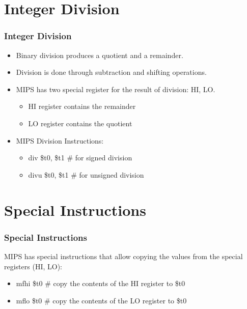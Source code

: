 \documentclass[
	10pt, %
	hmargin=1cm,vmargin=0cm,head=0.5cm,headsep=0pt,foot=0.5cm,margin=2cm
]{beamer}
\begin{document}
\section{Integer Division} 
\begin{frame}
	\frametitle{Integer Division}
	\begin{itemize}
		\item Binary division produces a quotient and a remainder. \pause
		\item Division is done through subtraction and shifting operations. \pause
		\item MIPS has two special register for the result of division: HI, LO. \pause
		\begin{itemize}
			\item HI register contains the remainder 
			\item LO register contains the quotient \pause
		\end{itemize}
		\item MIPS Division Instructions:
		\begin{itemize}
			\item \color{blue}div  \hspace{0.2cm}\color{red}\$t0\color{black}, \color{red}\$t1\color{black}	\hspace{0.3cm}\# for signed division
			\item \color{blue}divu \color{red}\$t0\color{black}, \color{red}\$t1\color{black}				\hspace{0.3cm}\# for unsigned division
		\end{itemize}
	\end{itemize}
\end{frame}

\section{Special Instructions}
\begin{frame}
	\frametitle{Special Instructions}
	MIPS has special instructions that allow copying the values from the special registers (HI, LO):
	\begin{itemize}
		\item \color{blue}mfhi \color{red}\$t0\color{black}\hspace{0.3cm} \# copy the contents of the HI register to \$t0 
		\item \color{blue}mflo \color{red}\$t0\color{black}\hspace{0.3cm} \# copy the contents of the LO register to \$t0 
	\end{itemize}
\end{frame}
\end{document}
